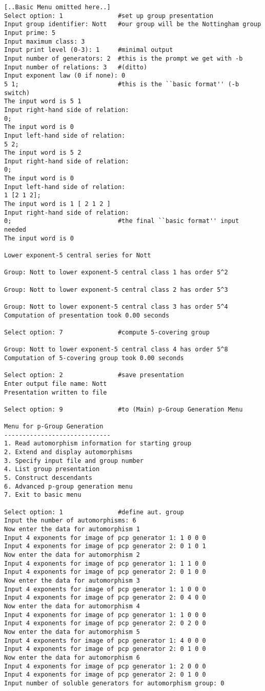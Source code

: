 \documentclass[12pt]{article}
\begin{document}
\begin{verbatim}
[..Basic Menu omitted here..]
Select option: 1               #set up group presentation
Input group identifier: Nott   #our group will be the Nottingham group
Input prime: 5
Input maximum class: 3
Input print level (0-3): 1     #minimal output
Input number of generators: 2  #this is the prompt we get with -b
Input number of relations: 3   #(ditto)
Input exponent law (0 if none): 0
5 1;                           #this is the ``basic format'' (-b switch)
The input word is 5 1 
Input right-hand side of relation:
0;  
The input word is 0 
Input left-hand side of relation:
5 2;
The input word is 5 2 
Input right-hand side of relation:
0;
The input word is 0 
Input left-hand side of relation:
1 [2 1 2];
The input word is 1 [ 2 1 2 ]
Input right-hand side of relation:
0;                             #the final ``basic format'' input needed
The input word is 0 

Lower exponent-5 central series for Nott

Group: Nott to lower exponent-5 central class 1 has order 5^2

Group: Nott to lower exponent-5 central class 2 has order 5^3

Group: Nott to lower exponent-5 central class 3 has order 5^4
Computation of presentation took 0.00 seconds

Select option: 7               #compute 5-covering group

Group: Nott to lower exponent-5 central class 4 has order 5^8
Computation of 5-covering group took 0.00 seconds

Select option: 2               #save presentation
Enter output file name: Nott
Presentation written to file

Select option: 9               #to (Main) p-Group Generation Menu

Menu for p-Group Generation
-----------------------------
1. Read automorphism information for starting group
2. Extend and display automorphisms
3. Specify input file and group number
4. List group presentation
5. Construct descendants
6. Advanced p-group generation menu
7. Exit to basic menu

Select option: 1               #define aut. group
Input the number of automorphisms: 6
Now enter the data for automorphism 1
Input 4 exponents for image of pcp generator 1: 1 0 0 0
Input 4 exponents for image of pcp generator 2: 0 1 0 1
Now enter the data for automorphism 2
Input 4 exponents for image of pcp generator 1: 1 1 0 0
Input 4 exponents for image of pcp generator 2: 0 1 0 0
Now enter the data for automorphism 3
Input 4 exponents for image of pcp generator 1: 1 0 0 0 
Input 4 exponents for image of pcp generator 2: 0 4 0 0 
Now enter the data for automorphism 4
Input 4 exponents for image of pcp generator 1: 1 0 0 0
Input 4 exponents for image of pcp generator 2: 0 2 0 0 
Now enter the data for automorphism 5
Input 4 exponents for image of pcp generator 1: 4 0 0 0 
Input 4 exponents for image of pcp generator 2: 0 1 0 0 
Now enter the data for automorphism 6
Input 4 exponents for image of pcp generator 1: 2 0 0 0 
Input 4 exponents for image of pcp generator 2: 0 1 0 0 
Input number of soluble generators for automorphism group: 0


\end{verbatim}
\end{document}
